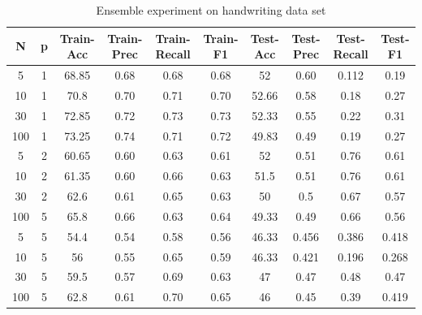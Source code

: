 \documentclass{article}
\begin{document}
 \begin{longtable}{c|c|c|c|c|c|c|c|c|c}
  \caption{Ensemble experiment on handwriting data set} \\
  \hline\hline
	  N & p & Train-Acc & Train-Prec & Train-Recall & Train-F1 & Test-Acc & Test-Prec & Test-Recall & Test-F1 \\[0.5ex]

  \hline
	 5 & 1 & 68.85 & 0.68 & 0.68 & 0.68 & 52 & 0.60 & 0.112 & 0.19 \\
	 10 & 1 & 70.8 & 0.70 & 0.71 & 0.70 & 52.66 & 0.58 & 0.18 & 0.27 \\
	 30 & 1 & 72.85 & 0.72 & 0.73 & 0.73 & 52.33 & 0.55 & 0.22 & 0.31 \\
	 100 & 1 & 73.25 & 0.74 & 0.71 & 0.72 & 49.83 & 0.49 & 0.19 & 0.27 \\
	 5 & 2 & 60.65 & 0.60 & 0.63 & 0.61 & 52 & 0.51 & 0.76 & 0.61 \\
	 10 & 2 & 61.35 & 0.60 & 0.66 & 0.63 & 51.5 & 0.51 & 0.76 & 0.61 \\
	 30 & 2 & 62.6 & 0.61 & 0.65 & 0.63 & 50 & 0.5 & 0.67 & 0.57 \\
	 100 & 5 & 65.8 & 0.66 & 0.63 & 0.64 & 49.33 & 0.49 & 0.66 & 0.56 \\
	 5 & 5 & 54.4 & 0.54 & 0.58 & 0.56 & 46.33 & 0.456 & 0.386 & 0.418 \\
	 10 & 5 & 56 & 0.55 & 0.65 & 0.59 & 46.33 & 0.421 & 0.196 & 0.268 \\
	 30 & 5 & 59.5 & 0.57 & 0.69 & 0.63 & 47 & 0.47 & 0.48 & 0.47 \\
	 100 & 5 & 62.8 & 0.61 & 0.70 & 0.65 & 46 & 0.45 & 0.39 & 0.419 \\ [0.5ex]
  \end{longtable}
  
\end{document}
